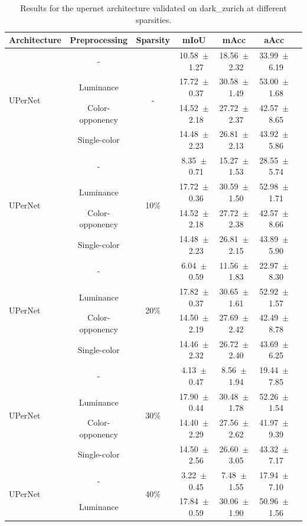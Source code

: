 \begin{table}[h]
\centering
\caption{Results for the upernet architecture validated on dark_zurich at different sparsities.}
\begin{tabular}{@{}lccc ccc@{}}
\toprule
Architecture & Preprocessing & Sparsity & mIoU & mAcc & aAcc \\
\midrule

\multirow{4}{*}{UPerNet} & - & \multirow{4}{*}{-} & 10.58~$\pm$~1.27 & 18.56~$\pm$~2.32 & 33.99~$\pm$~6.19 \\
& Luminance & & 17.72~$\pm$~0.37 & 30.58~$\pm$~1.49 & 53.00~$\pm$~1.68 \\
& Color-opponency & & 14.52~$\pm$~2.18 & 27.72~$\pm$~2.37 & 42.57~$\pm$~8.65 \\
& Single-color & & 14.48~$\pm$~2.23 & 26.81~$\pm$~2.13 & 43.92~$\pm$~5.86 \\
\midrule
\multirow{4}{*}{UPerNet} & - & \multirow{4}{*}{10\%} & 8.35~$\pm$~0.71 & 15.27~$\pm$~1.53 & 28.55~$\pm$~5.74 \\
& Luminance & & 17.72~$\pm$~0.36 & 30.59~$\pm$~1.50 & 52.98~$\pm$~1.71 \\
& Color-opponency & & 14.52~$\pm$~2.18 & 27.72~$\pm$~2.38 & 42.57~$\pm$~8.66 \\
& Single-color & & 14.48~$\pm$~2.23 & 26.81~$\pm$~2.15 & 43.89~$\pm$~5.90 \\
\midrule
\multirow{4}{*}{UPerNet} & - & \multirow{4}{*}{20\%} & 6.04~$\pm$~0.59 & 11.56~$\pm$~1.83 & 22.97~$\pm$~8.30 \\
& Luminance & & 17.82~$\pm$~0.37 & 30.65~$\pm$~1.61 & 52.92~$\pm$~1.57 \\
& Color-opponency & & 14.50~$\pm$~2.19 & 27.69~$\pm$~2.42 & 42.49~$\pm$~8.78 \\
& Single-color & & 14.46~$\pm$~2.32 & 26.72~$\pm$~2.40 & 43.69~$\pm$~6.25 \\
\midrule
\multirow{4}{*}{UPerNet} & - & \multirow{4}{*}{30\%} & 4.13~$\pm$~0.47 & 8.56~$\pm$~1.94 & 19.44~$\pm$~7.85 \\
& Luminance & & 17.90~$\pm$~0.44 & 30.48~$\pm$~1.78 & 52.26~$\pm$~1.54 \\
& Color-opponency & & 14.40~$\pm$~2.29 & 27.56~$\pm$~2.62 & 41.97~$\pm$~9.39 \\
& Single-color & & 14.50~$\pm$~2.56 & 26.60~$\pm$~3.05 & 43.32~$\pm$~7.17 \\
\midrule
\multirow{4}{*}{UPerNet} & - & \multirow{4}{*}{40\%} & 3.22~$\pm$~0.45 & 7.48~$\pm$~1.55 & 17.94~$\pm$~7.10 \\
& Luminance & & 17.84~$\pm$~0.59 & 30.06~$\pm$~1.90 & 50.96~$\pm$~1.56 \\

\end{tabular}
\end{table}

